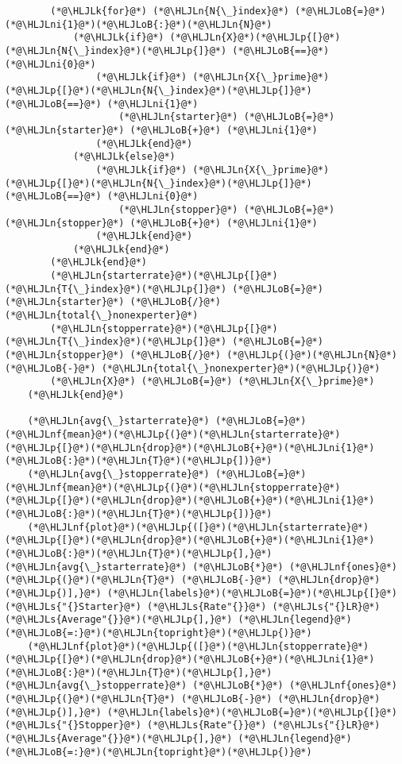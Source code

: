 \documentclass[12pt,a4paper]{article}
\newcommand{\HLJLk}[1]{\textcolor[RGB]{148,91,176}{\textbf{#1}}}
\newcommand{\HLJLn}[1]{#1}
\newcommand{\HLJLnf}[1]{\textcolor[RGB]{66,102,213}{#1}}
\newcommand{\HLJLs}[1]{\textcolor[RGB]{201,61,57}{#1}}
\newcommand{\HLJLni}[1]{\textcolor[RGB]{59,151,46}{#1}}
\newcommand{\HLJLoB}[1]{\textcolor[RGB]{102,102,102}{\textbf{#1}}}
\newcommand{\HLJLp}[1]{#1}
\begin{document}
\begin{lstlisting}
        (*@\HLJLk{for}@*) (*@\HLJLn{N{\_}index}@*) (*@\HLJLoB{=}@*) (*@\HLJLni{1}@*)(*@\HLJLoB{:}@*)(*@\HLJLn{N}@*)
            (*@\HLJLk{if}@*) (*@\HLJLn{X}@*)(*@\HLJLp{[}@*)(*@\HLJLn{N{\_}index}@*)(*@\HLJLp{]}@*) (*@\HLJLoB{==}@*) (*@\HLJLni{0}@*)
                (*@\HLJLk{if}@*) (*@\HLJLn{X{\_}prime}@*)(*@\HLJLp{[}@*)(*@\HLJLn{N{\_}index}@*)(*@\HLJLp{]}@*) (*@\HLJLoB{==}@*) (*@\HLJLni{1}@*)
                    (*@\HLJLn{starter}@*) (*@\HLJLoB{=}@*) (*@\HLJLn{starter}@*) (*@\HLJLoB{+}@*) (*@\HLJLni{1}@*)
                (*@\HLJLk{end}@*)
            (*@\HLJLk{else}@*)
                (*@\HLJLk{if}@*) (*@\HLJLn{X{\_}prime}@*)(*@\HLJLp{[}@*)(*@\HLJLn{N{\_}index}@*)(*@\HLJLp{]}@*) (*@\HLJLoB{==}@*) (*@\HLJLni{0}@*)
                    (*@\HLJLn{stopper}@*) (*@\HLJLoB{=}@*) (*@\HLJLn{stopper}@*) (*@\HLJLoB{+}@*) (*@\HLJLni{1}@*)
                (*@\HLJLk{end}@*)
            (*@\HLJLk{end}@*)
        (*@\HLJLk{end}@*)
        (*@\HLJLn{starterrate}@*)(*@\HLJLp{[}@*)(*@\HLJLn{T{\_}index}@*)(*@\HLJLp{]}@*) (*@\HLJLoB{=}@*) (*@\HLJLn{starter}@*) (*@\HLJLoB{/}@*) (*@\HLJLn{total{\_}nonexperter}@*)
        (*@\HLJLn{stopperrate}@*)(*@\HLJLp{[}@*)(*@\HLJLn{T{\_}index}@*)(*@\HLJLp{]}@*) (*@\HLJLoB{=}@*) (*@\HLJLn{stopper}@*) (*@\HLJLoB{/}@*) (*@\HLJLp{(}@*)(*@\HLJLn{N}@*) (*@\HLJLoB{-}@*) (*@\HLJLn{total{\_}nonexperter}@*)(*@\HLJLp{)}@*)
        (*@\HLJLn{X}@*) (*@\HLJLoB{=}@*) (*@\HLJLn{X{\_}prime}@*)
    (*@\HLJLk{end}@*)

    (*@\HLJLn{avg{\_}starterrate}@*) (*@\HLJLoB{=}@*) (*@\HLJLnf{mean}@*)(*@\HLJLp{(}@*)(*@\HLJLn{starterrate}@*)(*@\HLJLp{[}@*)(*@\HLJLn{drop}@*)(*@\HLJLoB{+}@*)(*@\HLJLni{1}@*)(*@\HLJLoB{:}@*)(*@\HLJLn{T}@*)(*@\HLJLp{])}@*)
    (*@\HLJLn{avg{\_}stopperrate}@*) (*@\HLJLoB{=}@*) (*@\HLJLnf{mean}@*)(*@\HLJLp{(}@*)(*@\HLJLn{stopperrate}@*)(*@\HLJLp{[}@*)(*@\HLJLn{drop}@*)(*@\HLJLoB{+}@*)(*@\HLJLni{1}@*)(*@\HLJLoB{:}@*)(*@\HLJLn{T}@*)(*@\HLJLp{])}@*)
    (*@\HLJLnf{plot}@*)(*@\HLJLp{([}@*)(*@\HLJLn{starterrate}@*)(*@\HLJLp{[}@*)(*@\HLJLn{drop}@*)(*@\HLJLoB{+}@*)(*@\HLJLni{1}@*)(*@\HLJLoB{:}@*)(*@\HLJLn{T}@*)(*@\HLJLp{],}@*) (*@\HLJLn{avg{\_}starterrate}@*) (*@\HLJLoB{*}@*) (*@\HLJLnf{ones}@*)(*@\HLJLp{(}@*)(*@\HLJLn{T}@*) (*@\HLJLoB{-}@*) (*@\HLJLn{drop}@*)(*@\HLJLp{)],}@*) (*@\HLJLn{labels}@*)(*@\HLJLoB{=}@*)(*@\HLJLp{[}@*)(*@\HLJLs{"{}Starter}@*) (*@\HLJLs{Rate"{}}@*) (*@\HLJLs{"{}LR}@*) (*@\HLJLs{Average"{}}@*)(*@\HLJLp{],}@*) (*@\HLJLn{legend}@*)(*@\HLJLoB{=:}@*)(*@\HLJLn{topright}@*)(*@\HLJLp{)}@*)
    (*@\HLJLnf{plot}@*)(*@\HLJLp{([}@*)(*@\HLJLn{stopperrate}@*)(*@\HLJLp{[}@*)(*@\HLJLn{drop}@*)(*@\HLJLoB{+}@*)(*@\HLJLni{1}@*)(*@\HLJLoB{:}@*)(*@\HLJLn{T}@*)(*@\HLJLp{],}@*) (*@\HLJLn{avg{\_}stopperrate}@*) (*@\HLJLoB{*}@*) (*@\HLJLnf{ones}@*)(*@\HLJLp{(}@*)(*@\HLJLn{T}@*) (*@\HLJLoB{-}@*) (*@\HLJLn{drop}@*)(*@\HLJLp{)],}@*) (*@\HLJLn{labels}@*)(*@\HLJLoB{=}@*)(*@\HLJLp{[}@*)(*@\HLJLs{"{}Stopper}@*) (*@\HLJLs{Rate"{}}@*) (*@\HLJLs{"{}LR}@*) (*@\HLJLs{Average"{}}@*)(*@\HLJLp{],}@*) (*@\HLJLn{legend}@*)(*@\HLJLoB{=:}@*)(*@\HLJLn{topright}@*)(*@\HLJLp{)}@*)


\end{lstlisting}
\end{document}
